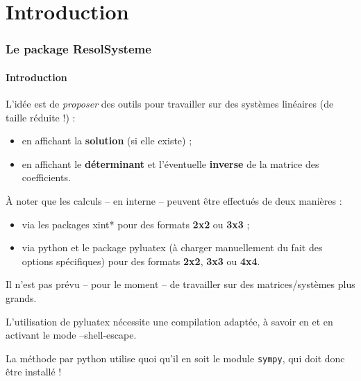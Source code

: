 \documentclass[a4paper,11pt]{article}
\begin{document}
\tableofcontents

\newpage

\part{Introduction}

\section{Le package ResolSysteme}

\subsection{Introduction}

\begin{noteblock}
L'idée est de \textit{proposer} des outils pour travailler sur des systèmes linéaires (de taille réduite !) :

\begin{itemize}
	\item en affichant la \textbf{solution} (si elle existe) ;
	\item en affichant le \textbf{déterminant} et l'éventuelle \textbf{inverse} de la matrice des coefficients.
\end{itemize}
\vspace*{-\baselineskip}\leavevmode
\end{noteblock}

\begin{importantblock}
À noter que les calculs -- en interne -- peuvent être effectués de deux manières :

\begin{itemize}
	\item via les packages \textsf{xint*} pour des formats \textbf{2x2} ou \textbf{3x3} ;
	\item via \textsf{python} et le package \textsf{pyluatex} (à charger manuellement du fait des options spécifiques) pour des formats \textbf{2x2}, \textbf{3x3} ou \textbf{4x4}.
\end{itemize}

Il n'est pas prévu -- pour le moment -- de travailler sur des matrices/systèmes plus grands.
\end{importantblock}

\begin{warningblock}
L'utilisation de \textsf{pyluatex} nécessite une compilation adaptée, à savoir en  et en activant le mode \textsf{--shell-escape}. 

\smallskip

La méthode par \textsf{python} utilise quoi qu'il en soit le module \texttt{sympy}, qui doit donc être installé !
\end{warningblock}
\end{document}
